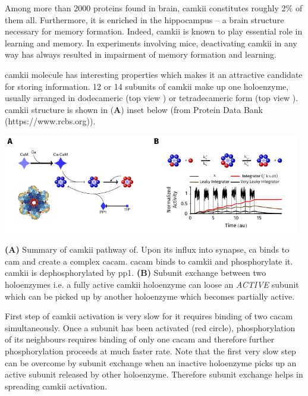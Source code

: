 \documentclass[]{resonance}
\begin{document}
 {
    Among more than 2000 proteins found in brain, \gls{camkii} constitutes roughly
    2\% of them all. Furthermore, it is enriched in the hippocampus -- a brain structure
    necessary for memory formation. Indeed, \gls{camkii} is known to play essential
    role in learning and memory. In experiments involving mice, deactivating
    \gls{camkii} in any way has always resulted in impairment of memory formation
    and learning. 

    \gls{camkii} molecule has interesting properties which makes it an
    attractive candidate for storing information. 12 or 14 subunits of
    \gls{camkii} make up one holoenzyme, usually arranged in dodecameric (top
    view ) or
            tetradecameric form (top view ). \gls{camkii} structure is shown in (\textbf{A})
    inset below (from Protein Data Bank (https://www.rcbs.org)).

    \includegraphics[width=13cm]{./camkii_properties.pdf}

    \textbf{(A)} Summary of \gls{camkii} pathway of. Upon its influx into
    synapse, \gls{ca} binds to \gls{cam} and create a complex \gls{cacam}.
    \gls{cacam} binds to \gls{camkii} and phosphorylate it.  \gls{camkii} is
    dephosphorylated by \gls{pp1}. \textbf{(B)} Subunit exchange
    between two holoenzymes i.e. a fully active \gls{camkii} holoenzyme can
    loose an \textit{ACTIVE} subunit which can be picked up by another
    holoenzyme which becomes partially active. 
    
    First step of \gls{camkii} activation is very slow for it requires binding
    of two \gls{cacam} simultaneously. Once a subunit has been activated (red
    circle), phosphorylation of its neighbours requires binding of only one
    \gls{cacam} and therefore further phosphorylation proceeds at much faster
    rate.  Note that the first very slow step can be overcome by subunit
    exchange when an inactive holoenzyme picks up an active subunit released by
    other holoenzyme. Therefore subunit exchange helps in spreading \gls{camkii}
    activation. 

}
\end{document}
